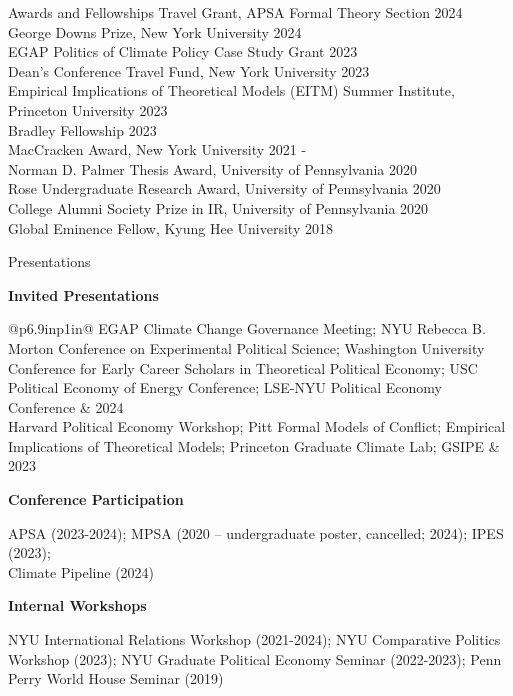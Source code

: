 \documentclass{resume} %
\begin{document}
\begin{rSection}{Awards and Fellowships}
Travel Grant, APSA Formal Theory Section \hfill 2024\\
George Downs Prize, New York University \hfill 2024\\
EGAP Politics of Climate Policy Case Study Grant \hfill 2023\\
Dean's Conference Travel Fund, New York University \hfill 2023\\
Empirical Implications of Theoretical Models (EITM) Summer Institute, Princeton University \hfill 2023\\
Bradley Fellowship \hfill 2023\\
MacCracken Award, New York University \hfill 2021 - \\
Norman D. Palmer Thesis Award, University of Pennsylvania \hfill 2020\\
Rose Undergraduate Research Award, University of Pennsylvania \hfill 2020\\
College Alumni Society Prize in IR, University of Pennsylvania \hfill 2020\\
Global Eminence Fellow, Kyung Hee University \hfill 2018
\end{rSection}

\begin{rSection}{Presentations}

\textbf{Invited Presentations}

\begin{table}[!htbp]
    \centering
    \begin{tabular}{@{\hspace*{2em}}p{6.9in}p{1in}@}
    EGAP Climate Change Governance Meeting; NYU  Rebecca B. Morton Conference on Experimental Political Science;  Washington University Conference for Early Career Scholars in Theoretical Political Economy; USC Political Economy of Energy Conference; LSE-NYU Political Economy Conference & 2024\\
      Harvard Political Economy Workshop; Pitt Formal Models of Conflict; Empirical Implications of Theoretical Models; Princeton Graduate Climate Lab; GSIPE    & 2023 
    \end{tabular}
\end{table}
\textbf{Conference Participation}

\hspace*{0.5em} APSA (2023-2024);  MPSA (2020 -- undergraduate poster, cancelled; 2024); IPES (2023); \\ Climate Pipeline (2024)

\textbf{Internal Workshops}

\hspace*{0.5em} NYU International Relations Workshop (2021-2024); NYU Comparative Politics Workshop (2023); NYU Graduate Political Economy Seminar (2022-2023); Penn Perry World House Seminar (2019)
\end{rSection}
\end{document}

